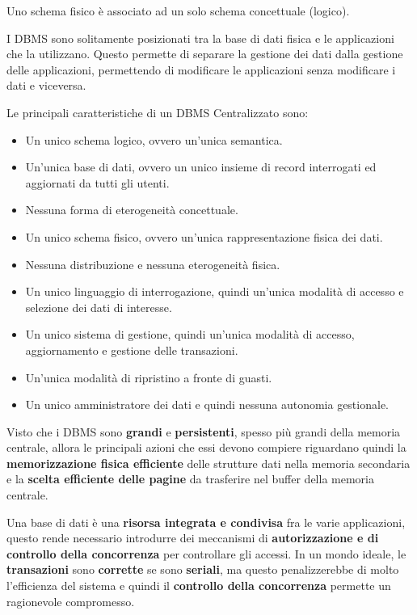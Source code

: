 \begin{nota}
    Uno schema fisico è associato ad un solo schema concettuale (logico).
\end{nota}
I DBMS sono solitamente posizionati tra la base di dati fisica e le applicazioni
che la utilizzano. Questo permette di separare la gestione dei dati dalla
gestione delle applicazioni, permettendo di modificare le applicazioni senza
modificare i dati e viceversa.

Le principali caratteristiche di un DBMS Centralizzato sono:
\begin{itemize}
      \item Un unico schema logico, ovvero un'unica semantica.
      \item Un'unica base di dati, ovvero un unico insieme di record interrogati
            ed aggiornati da tutti gli utenti.
      \item Nessuna forma di eterogeneità concettuale.
      \item Un unico schema fisico, ovvero un'unica rappresentazione fisica dei
            dati.
      \item Nessuna distribuzione e nessuna eterogeneità fisica.
      \item Un unico linguaggio di interrogazione, quindi un'unica modalità di
            accesso e selezione dei dati di interesse.
      \item Un unico sistema di gestione, quindi un'unica modalità di accesso,
            aggiornamento e gestione delle transazioni.
      \item Un'unica modalità di ripristino a fronte di guasti.
      \item Un unico amministratore dei dati e quindi nessuna autonomia gestionale.
\end{itemize}

Visto che i DBMS sono \textbf{grandi} e \textbf{persistenti}, spesso più grandi
della memoria centrale, allora le principali azioni che essi devono compiere
riguardano quindi la \textbf{memorizzazione fisica efficiente} delle strutture
dati nella memoria secondaria e la \textbf{scelta efficiente delle pagine} da
trasferire nel buffer della memoria centrale.

Una base di dati è una \textbf{risorsa integrata e condivisa} fra le varie
applicazioni, questo rende necessario introdurre dei meccanismi di
\textbf{autorizzazione e di controllo della concorrenza} per controllare gli
accessi. In un mondo ideale, le \textbf{transazioni} sono \textbf{corrette} se
sono \textbf{seriali}, ma questo penalizzerebbe di molto l'efficienza del sistema e
quindi il \textbf{controllo della concorrenza} permette un ragionevole compromesso.

